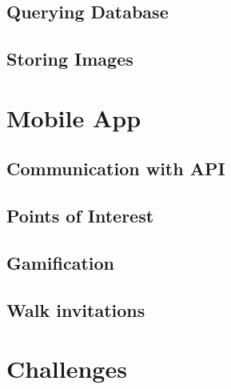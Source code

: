 \subsection{Querying Database}

\subsection{Storing Images} \label{implentation:storing-images}


\section{Mobile App}

\subsection{Communication with API}

\subsection{Points of Interest}

\subsection{Gamification} \label{subsection:gamification}


\subsection{Walk invitations}

\section{Challenges}